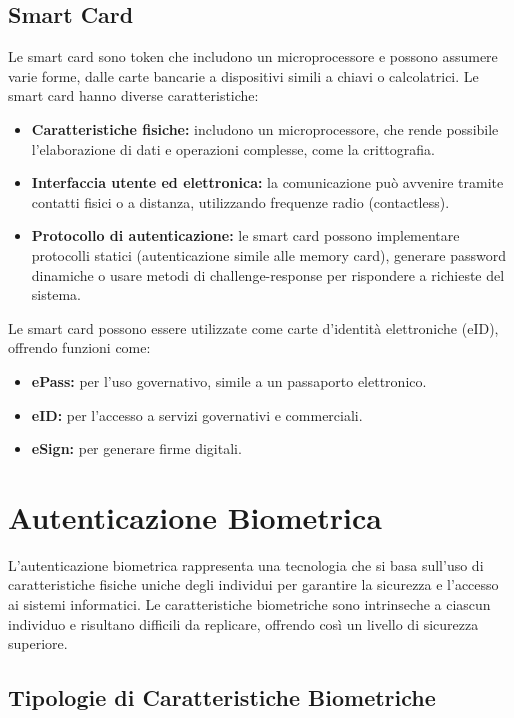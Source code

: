 \subsection{Smart Card}

Le smart card sono token che includono un microprocessore e possono assumere varie forme, dalle carte bancarie a dispositivi simili a chiavi o calcolatrici. Le smart card hanno diverse caratteristiche:

\begin{itemize}
    \item \textbf{Caratteristiche fisiche:} includono un microprocessore, che rende possibile l'elaborazione di dati e operazioni complesse, come la crittografia.
    \item \textbf{Interfaccia utente ed elettronica:} la comunicazione può avvenire tramite contatti fisici o a distanza, utilizzando frequenze radio (contactless).
    \item \textbf{Protocollo di autenticazione:} le smart card possono implementare protocolli statici (autenticazione simile alle memory card), generare password dinamiche o usare metodi di challenge-response per rispondere a richieste del sistema.
\end{itemize}

Le smart card possono essere utilizzate come carte d'identità elettroniche (eID), offrendo funzioni come:

\begin{itemize}
    \item \textbf{ePass:} per l'uso governativo, simile a un passaporto elettronico.
    \item \textbf{eID:} per l'accesso a servizi governativi e commerciali.
    \item \textbf{eSign:} per generare firme digitali.
\end{itemize}

\section{Autenticazione Biometrica}

L'autenticazione biometrica rappresenta una tecnologia che si basa sull'uso di caratteristiche fisiche uniche degli individui per garantire la sicurezza e l'accesso ai sistemi informatici. Le caratteristiche biometriche sono intrinseche a ciascun individuo e risultano difficili da replicare, offrendo così un livello di sicurezza superiore.

\subsection{Tipologie di Caratteristiche Biometriche}

